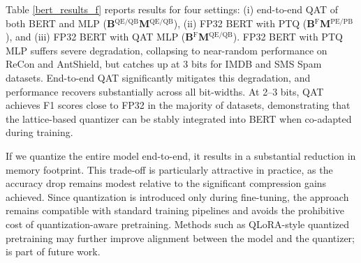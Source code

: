 \documentclass{article}
\theoremstyle{definition}
\theoremstyle{remark}
\begin{document}
Table \ref{bert_results_f} reports results for four settings: (i) end-to-end QAT of both BERT and MLP (\textbf{B$^{\text{QE/QB}}$M$^{\text{QE/QB}}$}), 
(ii) FP32 BERT with PTQ (\textbf{B$^{\text{F}}$M$^{\text{PE/PB}}$}), and (iii) FP32 BERT with QAT MLP (\textbf{B$^{\text{F}}$M$^{\text{QE/QB}}$}). \noindent 
FP32 BERT with PTQ MLP suffers severe degradation, collapsing to near-random performance on ReCon and AntShield, but catches up at 3 bits for IMDB and SMS Spam datasets. End-to-end QAT significantly mitigates this degradation, and performance recovers substantially across all bit-widths. At 2–3 bits, QAT achieves F1 scores close to FP32 in the majority of datasets, demonstrating that the lattice-based quantizer can be stably integrated into BERT when co-adapted during training. 

If we quantize the entire model end-to-end, it results in a substantial reduction in memory footprint. This trade-off is particularly attractive in practice, as the accuracy drop remains modest relative to the significant compression gains achieved. Since quantization is introduced only during fine-tuning, the approach remains compatible with standard training pipelines and avoids the prohibitive cost of quantization-aware pretraining. Methods such as QLoRA-style quantized pretraining may further improve alignment between the model and the quantizer; is part of future work.

       
\end{document}
